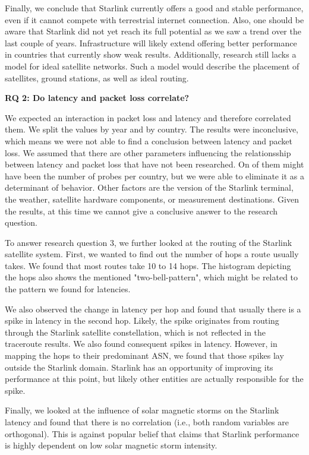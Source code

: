 Finally, we conclude that Starlink currently offers a good and stable
performance, even if it cannot compete with terrestrial internet connection.
Also, one should be aware that Starlink did not yet reach its full potential as
we saw a trend over the last couple of years. Infrastructure will likely
extend offering better performance in countries that currently show weak
results. Additionally, research still lacks a model for ideal satellite
networks. Such a model would describe the placement of satellites, ground
stations, as well as ideal routing.

\textbf{RQ 2: Do latency and packet loss correlate?}

We expected an interaction in packet loss and latency and therefore correlated
them. We split the values by year and by country. The results were
inconclusive, which means we were not able to find a conclusion between latency
and packet loss. We assumed that there are other parameters influencing the
relationsship between latency and packet loss that have not been researched. On
of them might have been the number of probes per country, but we were able to
eliminate it as a determinant of behavior. Other factors are the version of the
Starlink terminal, the weather, satellite hardware components, or measurement
destinations. Given the results, at this time we cannot give a conclusive
answer to the research question.


To answer research question 3, we further looked at the routing of the Starlink
satellite system. First, we wanted to find out the number of hops a route
usually takes. We found that most routes take 10 to 14 hops. The histogram
depicting the hops also shows the mentioned "two-bell-pattern", which might be
related to the pattern we found for latencies.

We also observed the change in latency per hop and found that usually there is
a spike in latency in the second hop. Likely, the spike originates from routing
through the Starlink satellite constellation, which is not reflected in the
traceroute results. We also found consequent spikes in latency. However, in
mapping the hops to their predominant ASN, we found that those spikes lay
outside the Starlink domain. Starlink has an opportunity of improving its
performance at this point, but likely other entities are actually responsible
for the spike.

Finally, we looked at the influence of solar magnetic storms on the Starlink
latency and found that there is no correlation (i.e., both random
variables are orthogonal). This is against popular belief that claims that
Starlink performance is highly dependent on low solar magnetic storm intensity.

